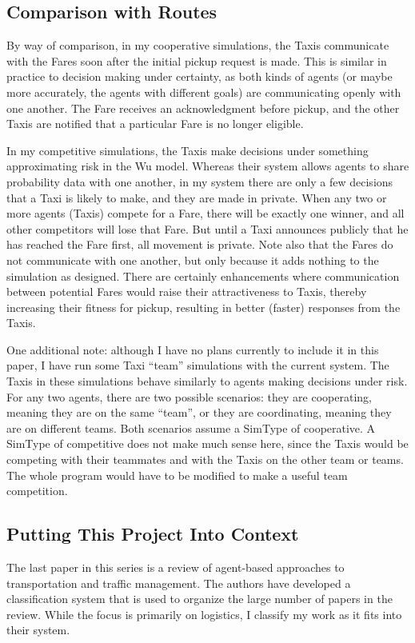 \documentclass[11pt,letterpaper,onecolumn,twoside,openright,final]{report}
\begin{document}
\subsection{Comparison with Routes}
By way of comparison, in my cooperative simulations, the Taxis communicate with the Fares soon after the initial pickup request is made.
This is similar in practice to decision making under certainty, as both kinds of agents (or maybe more accurately, the agents with different goals) are communicating openly with one another.
The Fare receives an acknowledgment before pickup, and the other Taxis are notified that a particular Fare is no longer eligible.

In my competitive simulations, the Taxis make decisions under something approximating risk in the Wu model.
Whereas their system allows agents to share probability data with one another, in my system there are only a few decisions that a Taxi is likely to make, and they are made in private.
When any two or more agents (Taxis) compete for a Fare, there will be exactly one winner, and all other competitors will lose that Fare.
But until a Taxi announces publicly that he has reached the Fare first, all movement is private.
Note also that the Fares do not communicate with one another, but only because it adds nothing to the simulation as designed.
There are certainly enhancements where communication between potential Fares would raise their attractiveness to Taxis, thereby increasing their fitness for pickup, resulting in better (faster) responses from the Taxis.

One additional note: although I have no plans currently to include it in this paper, I have run some Taxi ``team'' simulations with the current system.
The Taxis in these simulations behave similarly to agents making decisions under risk.
For any two agents, there are two possible scenarios: they are cooperating, meaning they are on the same ``team'', or they are coordinating, meaning they are on different teams.
Both scenarios assume a SimType of cooperative.
A SimType of competitive does not make much sense here, since the Taxis would be competing with their teammates and with the Taxis on the other team or teams.
The whole program would have to be modified to make a useful team competition.

\subsection{Putting This Project Into Context}
The last paper in this series is a review of agent-based approaches to transportation and traffic management.
The authors have developed a classification system that is used to organize the large number of papers in the review.
While the focus is primarily on logistics, I classify my work as it fits into their system.
\end{document}
